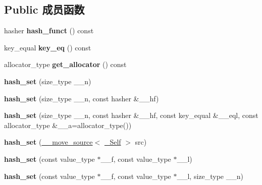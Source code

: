 \subsection*{Public 成员函数}
\begin{DoxyCompactItemize}
\item 
\mbox{\label{classhash__set_aa5660610ef9255d2419563073dcfb866}} 
hasher {\bfseries hash\+\_\+funct} () const
\item 
\mbox{\label{classhash__set_a889e0896ad47d0a0a2d334dbdc801d11}} 
key\+\_\+equal {\bfseries key\+\_\+eq} () const
\item 
\mbox{\label{classhash__set_ad2f92b7a2f4502f937f9f42eed398c77}} 
allocator\+\_\+type {\bfseries get\+\_\+allocator} () const
\item 
\mbox{\label{classhash__set_ae78bdc2573639eeea178df54a0f0c1a5}} 
{\bfseries hash\+\_\+set} (size\+\_\+type \+\_\+\+\_\+n)
\item 
\mbox{\label{classhash__set_a70f9d44a533228315eb50031e50c10c1}} 
{\bfseries hash\+\_\+set} (size\+\_\+type \+\_\+\+\_\+n, const hasher \&\+\_\+\+\_\+hf)
\item 
\mbox{\label{classhash__set_adc5841a77827ddf431132d7d4c9d0657}} 
{\bfseries hash\+\_\+set} (size\+\_\+type \+\_\+\+\_\+n, const hasher \&\+\_\+\+\_\+hf, const key\+\_\+equal \&\+\_\+\+\_\+eql, const allocator\+\_\+type \&\+\_\+\+\_\+a=allocator\+\_\+type())
\item 
\mbox{\label{classhash__set_aefeefed1a7dc765902fe9c76c3e557ed}} 
{\bfseries hash\+\_\+set} (\hyperlink{class____move__source}{\+\_\+\+\_\+move\+\_\+source}$<$ \hyperlink{classhash__set}{\+\_\+\+Self} $>$ src)
\item 
\mbox{\label{classhash__set_a785e681cfb1bded03a9cd20d79023065}} 
{\bfseries hash\+\_\+set} (const value\+\_\+type $\ast$\+\_\+\+\_\+f, const value\+\_\+type $\ast$\+\_\+\+\_\+l)
\item 
\mbox{\label{classhash__set_a47f76bc9457762f32096b7e6cb4bfb06}} 
{\bfseries hash\+\_\+set} (const value\+\_\+type $\ast$\+\_\+\+\_\+f, const value\+\_\+type $\ast$\+\_\+\+\_\+l, size\+\_\+type \+\_\+\+\_\+n)

\end{DoxyCompactItemize}
